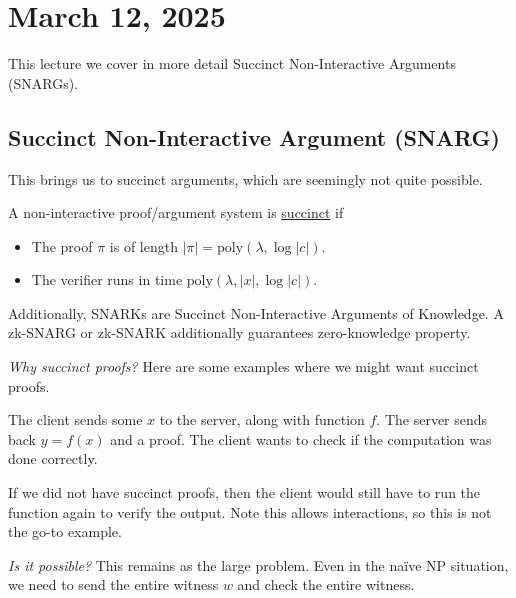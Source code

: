 \section{March 12, 2025}
\label{20250312}

This lecture we cover in more detail Succinct Non-Interactive Arguments (SNARGs).

\subsection{Succinct Non-Interactive Argument (SNARG)}
This brings us to succinct arguments, which are seemingly not quite possible.
\begin{definition}
    A non-interactive proof/argument system is \ul{succinct} if
    \begin{itemize}
        \item The proof $\pi$ is of length $|\pi| = \mathrm{poly}(\lambda, \log |c|)$.
        \item The verifier runs in time $\mathrm{poly}(\lambda, |x|, \log|c|)$.
    \end{itemize}
\end{definition}
Additionally, SNARKs are Succinct Non-Interactive Arguments of Knowledge. A zk-SNARG or zk-SNARK additionally guarantees zero-knowledge property.

\emph{Why succinct proofs?} Here are some examples where we might want succinct proofs.
\begin{example}
    The client sends some $x$ to the server, along with function $f$. The server sends back $y = f(x)$ and a proof. The client wants to check if the computation was done correctly.


    If we did not have succinct proofs, then the client would still have to run the function again to verify the output. Note this allows interactions, so this is not the go-to example.
\end{example}

\emph{Is it possible?} This remains as the large problem. Even in the na\"ive \textsf{NP} situation, we need to send the entire witness $w$ and check the entire witness.

